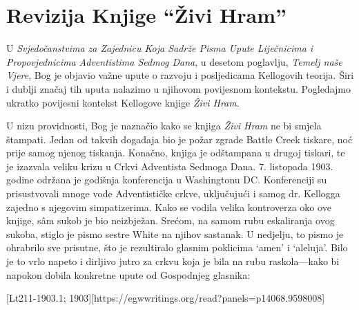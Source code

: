 \chapter{Revizija Knjige “Živi Hram”}

U \textit{Svjedočanstvima za Zajednicu Koja Sadrže Pisma Upute Liječnicima i Propovjednicima Adventistima Sedmog Dana}, u desetom poglavlju, \textit{Temelj naše Vjere}, Bog je objavio važne upute o razvoju i posljedicama Kellogovih teorija. Širi i dublji značaj tih uputa nalazimo u njihovom povijesnom kontekstu. Pogledajmo ukratko povijesni kontekst Kellogove knjige \textit{Živi Hram}.

U nizu providnosti, Bog je naznačio kako se knjiga \textit{Živi Hram} ne bi smjela štampati. Jedan od takvih događaja bio je požar zgrade Battle Creek tiskare, noć prije samog njenog tiskanja. Konačno, knjiga je odštampana u drugoj tiskari, te je izazvala veliku krizu u Crkvi Adventista Sedmoga Dana. 7. listopada 1903. godine održana je godišnja konferencija u Washingtonu DC. Konferenciji su prisustvovali mnoge vođe Adventističke crkve, uključujući i samog dr. Kellogga zajedno s njegovim simpatizerima. Kako se vodila velika kontroverza oko ove knjige, sâm sukob je bio neizbježan. Srećom, na samom rubu eskaliranja ovog sukoba, stiglo je pismo sestre White na njihov sastanak. U nedjelju, to pismo je ohrabrilo sve prisutne, što je rezultiralo glasnim poklicima ‘amen’ i ‘aleluja’. Bilo je to vrlo napeto i dirljivo jutro za crkvu koja je bila na rubu raskola—kako bi napokon dobila konkretne upute od Gospodnjeg glasnika:

[Lt211-1903.1; 1903][https://egwwritings.org/read?panels=p14068.9598008]

